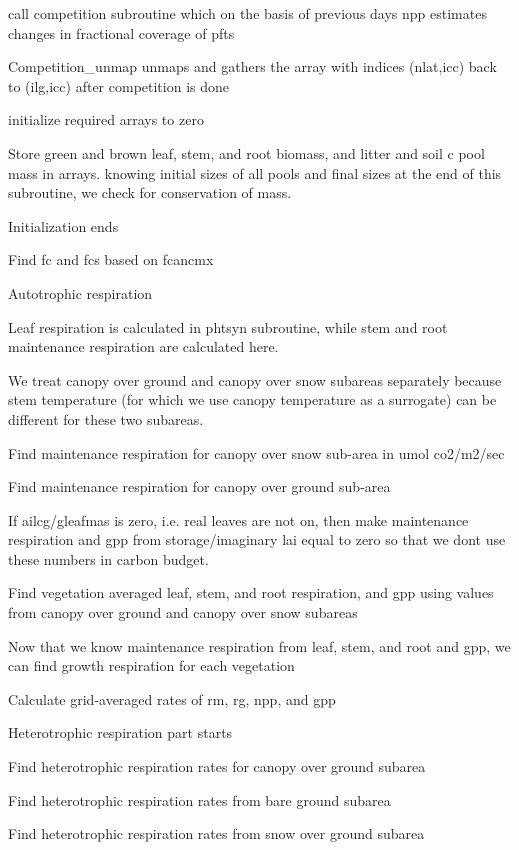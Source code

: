 call competition subroutine which on the basis of previous day\textquotesingle{}s npp estimates changes in fractional coverage of pfts

Competition\+\_\+unmap unmaps and gathers the array with indices (nlat,icc) back to (ilg,icc) after competition is done

initialize required arrays to zero

Store green and brown leaf, stem, and root biomass, and litter and soil c pool mass in arrays. knowing initial sizes of all pools and final sizes at the end of this subroutine, we check for conservation of mass.

Initialization ends

Find fc and fcs based on fcancmx

Autotrophic respiration

Leaf respiration is calculated in phtsyn subroutine, while stem and root maintenance respiration are calculated here.

We treat canopy over ground and canopy over snow subareas separately because stem temperature (for which we use canopy temperature as a surrogate) can be different for these two subareas.

Find maintenance respiration for canopy over snow sub-\/area in umol co2/m2/sec

Find maintenance respiration for canopy over ground sub-\/area

If ailcg/gleafmas is zero, i.\+e. real leaves are not on, then make maintenance respiration and gpp from storage/imaginary lai equal to zero so that we don\textquotesingle{}t use these numbers in carbon budget.

Find vegetation averaged leaf, stem, and root respiration, and gpp using values from canopy over ground and canopy over snow subareas

Now that we know maintenance respiration from leaf, stem, and root and gpp, we can find growth respiration for each vegetation

Calculate grid-\/averaged rates of rm, rg, npp, and gpp

\begin{DoxyVerb} Heterotrophic respiration part starts \end{DoxyVerb}


Find heterotrophic respiration rates for canopy over ground subarea

Find heterotrophic respiration rates from bare ground subarea

Find heterotrophic respiration rates from snow over ground subarea

